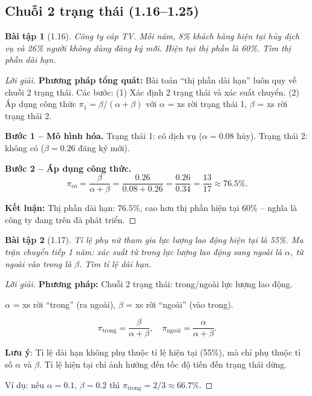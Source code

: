 \documentclass[8pt,a4paper]{article}
\newtheorem{exercise}{Bài tập}
\newenvironment{solution}{\begin{proof}[Lời giải]}{\end{proof}}
\begin{document}
\subsection*{Chuỗi 2 trạng thái (1.16--1.25)}

\begin{exercise}[1.16]
Công ty cáp TV. Mỗi năm, 8\% khách hàng hiện tại hủy dịch vụ và 26\% người không dùng đăng ký mới. Hiện tại thị phần là 60\%. Tìm thị phần dài hạn.
\end{exercise}
\begin{solution}
\textbf{Phương pháp tổng quát:} Bài toán ``thị phần dài hạn'' luôn quy về chuỗi 2 trạng thái. Các bước: (1) Xác định 2 trạng thái và xác suất chuyển. (2) Áp dụng công thức $\pi_1 = \beta/(\alpha+\beta)$ với $\alpha$ = xs rời trạng thái 1, $\beta$ = xs rời trạng thái 2.

\textbf{Bước 1 -- Mô hình hóa.}
Trạng thái 1: có dịch vụ ($\alpha = 0.08$ hủy). Trạng thái 2: không có ($\beta = 0.26$ đăng ký mới).

\textbf{Bước 2 -- Áp dụng công thức.}
\[
  \pi_{\text{có}} = \frac{\beta}{\alpha+\beta} = \frac{0.26}{0.08+0.26} = \frac{0.26}{0.34} = \frac{13}{17} \approx 76.5\%.
\]

\textbf{Kết luận:} Thị phần dài hạn: $\mathbf{76.5\%}$, cao hơn thị phần hiện tại 60\% -- nghĩa là công ty đang trên đà phát triển.
\end{solution}

\begin{exercise}[1.17]
Tỉ lệ phụ nữ tham gia lực lượng lao động hiện tại là 55\%. Ma trận chuyển tiếp 1 năm: xác suất từ \emph{trong} lực lượng lao động sang \emph{ngoài} là $\alpha$, từ \emph{ngoài} vào \emph{trong} là $\beta$. Tìm tỉ lệ dài hạn.
\end{exercise}
\begin{solution}
\textbf{Phương pháp:} Chuỗi 2 trạng thái: trong/ngoài lực lượng lao động.

$\alpha$ = xs rời ``trong'' (ra ngoài), $\beta$ = xs rời ``ngoài'' (vào trong).

\[
  \pi_{\text{trong}} = \frac{\beta}{\alpha+\beta}, \quad \pi_{\text{ngoài}} = \frac{\alpha}{\alpha+\beta}.
\]

\textbf{Lưu ý}: Tỉ lệ dài hạn không phụ thuộc tỉ lệ hiện tại (55\%), mà chỉ phụ thuộc tỉ số $\alpha$ và $\beta$. Tỉ lệ hiện tại chỉ ảnh hưởng đến tốc độ tiến đến trạng thái dừng.

Ví dụ: nếu $\alpha = 0.1$, $\beta = 0.2$ thì $\pi_{\text{trong}} = 2/3 \approx 66.7\%$.
\end{solution}
\end{document}
